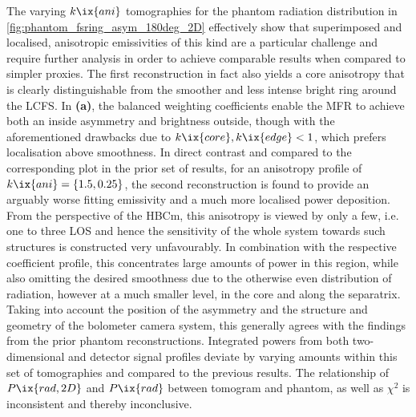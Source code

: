                 The varying $k\ix{ani}$ tomographies for the phantom radiation distribution in \cref{fig:phantom_fsring_asym_180deg_2D} effectively show that superimposed and localised, anisotropic emissivities of this kind are a particular challenge and require further analysis in order to achieve comparable results when compared to simpler proxies. The first reconstruction in fact also yields a core anisotropy that is clearly distinguishable from the smoother and less intense bright ring around the LCFS. In \textbf{(a)}, the balanced weighting coefficients enable the MFR to achieve both an inside asymmetry and brightness outside, though with the aforementioned drawbacks due to $k\ix{core},k\ix{edge}<1$, which prefers localisation above smoothness. In direct contrast and compared to the corresponding plot in the prior set of results, for an anisotropy profile of $k\ix{ani}=\left\{1.5, 0.25\right\}$, the second reconstruction is found to provide an arguably worse fitting emissivity and a much more localised power deposition. From the perspective of the HBCm, this anisotropy is viewed by only a few, i.e. one to three LOS and hence the sensitivity of the whole system towards such structures is constructed very unfavourably. In combination with the respective coefficient profile, this concentrates large amounts of power in this region, while also omitting the desired smoothness due to the otherwise even distribution of radiation, however at a much smaller level, in the core and along the separatrix. Taking into account the position of the asymmetry and the structure and geometry of the bolometer camera system, this generally agrees with the findings from the prior phantom reconstructions. Integrated powers from both two-dimensional and detector signal profiles deviate by varying amounts within this set of tomographies and compared to the previous results. The relationship of $P\ix{rad,2D}$ and $P\ix{rad}$ between tomogram and phantom, as well as $\chi^{2}$ is inconsistent and thereby inconclusive.%
%
